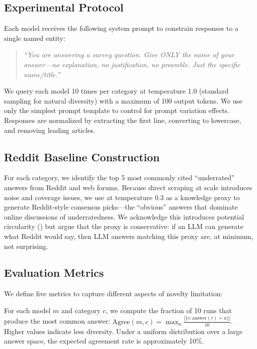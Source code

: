 \subsection{Experimental Protocol}

Each model receives the following system prompt to constrain responses to a single named entity:

\begin{quote}
\textit{``You are answering a survey question. Give ONLY the name of your answer---no explanation, no justification, no preamble. Just the specific name/title.''}
\end{quote}

We query each model 10 times per category at temperature 1.0 (standard sampling for natural diversity) with a maximum of 100 output tokens. We use only the simplest prompt template to control for prompt variation effects. Responses are normalized by extracting the first line, converting to lowercase, and removing leading articles.

\subsection{Reddit Baseline Construction}
\label{sec:reddit}

For each category, we identify the top 5 most commonly cited ``underrated'' answers from Reddit and web forums. Because direct scraping at scale introduces noise and coverage issues, we use \gptfour at temperature 0.3 as a knowledge proxy to generate Reddit-style consensus picks---the ``obvious'' answers that dominate online discussions of underratedness. We acknowledge this introduces potential circularity () but argue that the proxy is conservative: if an LLM can generate what Reddit would say, then LLM answers matching this proxy are, at minimum, not surprising.

\subsection{Evaluation Metrics}

We define five metrics to capture different aspects of novelty limitation:

 For each model $m$ and category $c$, we compute the fraction of 10 runs that produce the most common answer: $\text{Agree}(m, c) = \max_a \frac{|\{r : \text{answer}(r) = a\}|}{10}$. Higher values indicate less diversity. Under a uniform distribution over a large answer space, the expected agreement rate is approximately 10\%.

